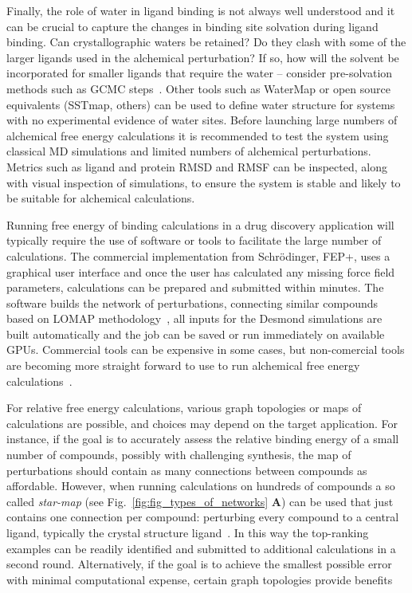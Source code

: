 \documentclass[9pt,bestpractices]{livecoms}
\begin{document}
Finally, the role of water in ligand binding is not always well understood and it can be crucial to capture the changes in binding site solvation during ligand binding. Can crystallographic waters be retained? Do they clash with some of the larger ligands used in the alchemical perturbation? If so, how will the solvent be incorporated for smaller ligands that require the water -- consider pre-solvation methods such as GCMC steps~\cite{michel2010prediction}. Other tools such as WaterMap or open source equivalents (SSTmap, others) can be used to define water structure for systems with no experimental evidence of water sites. Before launching large numbers of alchemical free energy calculations it is recommended to test the system using classical MD simulations and limited numbers of alchemical perturbations. Metrics such as ligand and protein RMSD and RMSF can be inspected, along with visual inspection of simulations, to ensure the system is stable and likely to be suitable for alchemical calculations. 

Running free energy of binding calculations in a drug discovery application will typically require the use of software or tools to facilitate the large number of calculations. The commercial implementation from Schr\"{o}dinger, FEP+, uses a graphical user interface and once the user has calculated any missing force field parameters, calculations can be prepared and submitted within minutes. The software builds the network of perturbations, connecting similar compounds based on LOMAP methodology~\cite{liu2013lead}, all inputs for the Desmond simulations are built automatically and the job can be saved or run immediately on available GPUs. Commercial tools can be expensive in some cases, but non-comercial tools are becoming more straight forward to use to run alchemical free energy calculations~\cite{gapsys2015pmx, loeffler2015fesetup, song2019using, gapsys2020large,  jespers2019qligfep, hedges2019biosimspace, kuhn2020automated}.

For relative free energy calculations, various graph topologies or maps of calculations are possible, and choices may depend on the target application. For instance, if the goal is to accurately assess the relative binding energy of a small number of compounds, possibly with challenging synthesis, the map of perturbations should contain as many connections between compounds as affordable. However, when running calculations on hundreds of compounds a so called \emph{star-map} (see Fig.~\ref{fig:fig_types_of_networks} \textbf{A}) can be used that just contains one connection per compound: perturbing every compound to a central ligand, typically the crystal structure ligand~\cite{konze2019reactionbased}. In this way the top-ranking examples can be readily identified and submitted to additional calculations in a second round. Alternatively, if the goal is to achieve the smallest possible error with minimal computational expense, certain graph topologies provide benefits~\cite{https://doi.org/10.1002/jcc.26095, https://doi.org/10.1021/acs.jcim.9b00528}
\end{document}
